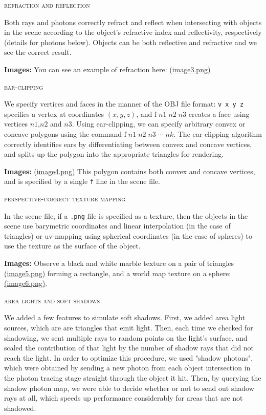 \documentclass{article}
\begin{document}
\begin{center}\textsc{refraction and reflection}\end{center} 
Both rays and photons correctly refract and reflect when intersecting with objects in the scene according to the object's refractive index and reflectivity, respectively (details for photons below). Objects can be both reflective and refractive and we see the correct result. 

\vspace{3mm}
{\bf Images:} You can see an example of refraction here: \href{run://images/image3.png}{\underline{(image3.png)}}


\begin{center}\textsc{ear-clipping}\end{center} 
We specify vertices and faces in the manner of the OBJ file format: \verb+v x y z+ specifies a vertex at coordinates $(x,y,z)$, and $\mathrm{f}\; n1 \; n2 \; n3$ creates a face using vertices $n1$,$n2$ and $n3$. Using ear-clipping, we can specify arbitrary convex or concave polygons using the command $\mathrm{f }\; n1 \; n2 \; n3 \; \cdots \; nk$. The ear-clipping algorithm correctly identifies ears by differentiating between convex and concave vertices, and splits up the polygon into the appropriate triangles for rendering.

\vspace{3mm}
{\bf Images:} \href{run://images/image4.png}{\underline{(image4.png)}} This polygon contains both convex and concave vertices, and is specified by a single \verb+f+ line in the scene file.

\begin{center}\textsc{perspective-correct texture mapping}\end{center} 
In the scene file, if a \verb+.png+ file is specified as a texture, then the objects in the scene use barymetric coordinates and linear interpolation (in the case of triangles) or uv-mapping using spherical coordinates (in the case of spheres) to use the texture as the surface of the object.

\vspace{3mm}
{\bf Images:} Observe a black and white marble texture on a pair of triangles \href{run://images/image5.png}{\underline{(image5.png)}} forming a rectangle, and a world map texture on a sphere: \href{run://images/image6.png}{\underline{(image6.png)}}.

\begin{center}\textsc{area lights and soft shadows}\end{center} 
We added a few features to simulate soft shadows. First, we added area light sources, which are are triangles that emit light. Then, each time we checked for shadowing, we sent multiple rays to random points on the light's surface, and scaled the contribution of that light by the number of shadow rays that did not reach the light. In order to optimize this procedure, we used "shadow photons", which were obtained by sending a new photon from each object intersection in the photon tracing stage straight through the object it hit. Then, by querying the shadow photon map, we were able to decide whether or not to send out shadow rays at all, which speeds up performance considerably for areas that are not shadowed.
\end{document}
